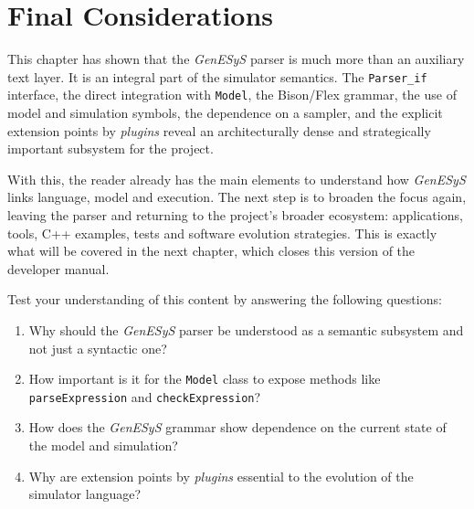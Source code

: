 \section{Final Considerations}
\label{sec:cap9_consideracoes_finais}

This chapter has shown that the \textit{GenESyS} parser is much more than an auxiliary text layer. It is an integral part of the simulator semantics. The \texttt{Parser\_if} interface, the direct integration with \texttt{Model}, the Bison/Flex grammar, the use of model and simulation symbols, the dependence on a sampler, and the explicit extension points by \textit{plugins} reveal an architecturally dense and strategically important subsystem for the project.

With this, the reader already has the main elements to understand how \textit{GenESyS} links language, model and execution. The next step is to broaden the focus again, leaving the parser and returning to the project's broader ecosystem: applications, tools, C++ examples, tests and software evolution strategies. This is exactly what will be covered in the next chapter, which closes this version of the developer manual.

Test your understanding of this content by answering the following questions:

\begin{enumerate}
 \item Why should the \textit{GenESyS} parser be understood as a semantic subsystem and not just a syntactic one?

\item How important is it for the \texttt{Model} class to expose methods like \texttt{parseExpression} and \texttt{checkExpression}?

\item How does the \textit{GenESyS} grammar show dependence on the current state of the model and simulation?

\item Why are extension points by \textit{plugins} essential to the evolution of the simulator language?
\end{enumerate}
